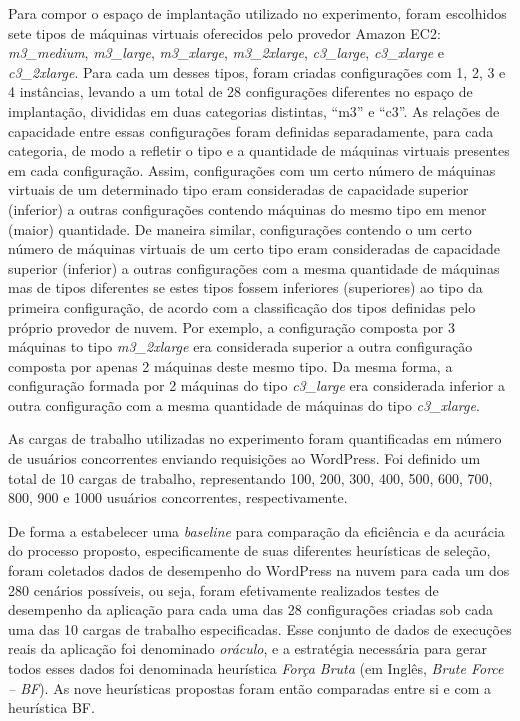 \documentclass[10pt,conference,compsocconf]{IEEEtran}
\begin{document}
Para compor o espaço de implantação utilizado no experimento, 
foram escolhidos sete tipos de máquinas virtuais oferecidos pelo provedor Amazon EC2:
{\em m3\_medium}, {\em m3\_large}, {\em m3\_xlarge}, {\em m3\_2xlarge}, {\em c3\_large}, {\em c3\_xlarge} e {\em c3\_2xlarge}. Para cada um desses tipos, foram criadas configurações
com 1, 2, 3 e 4 instâncias, levando a um total de 28 configurações diferentes no espaço de implantação, divididas em duas categorias distintas, ``m3'' e ``c3''. As relações de capacidade entre essas configurações foram definidas separadamente, para cada categoria, de modo a refletir o tipo e a quantidade de máquinas virtuais presentes em cada configuração. Assim, configurações com um certo número de máquinas virtuais de um determinado tipo eram consideradas de capacidade superior (inferior) a outras configurações contendo máquinas do mesmo tipo em menor (maior) quantidade. De maneira similar, configurações contendo o um certo número de máquinas virtuais de um certo tipo eram consideradas de capacidade superior (inferior) a outras configurações com a mesma quantidade de máquinas mas de tipos diferentes se estes tipos fossem inferiores (superiores) ao tipo da primeira configuração, de acordo com a classificação dos tipos definidas pelo próprio provedor de nuvem.  Por exemplo, a configuração composta por 3 máquinas to tipo {\em m3\_2xlarge} era considerada superior a outra configuração composta por apenas 2 máquinas deste mesmo tipo. Da mesma forma, a configuração formada por 2 máquinas do tipo  {\em c3\_large} era considerada inferior a outra configuração com a mesma quantidade de máquinas do tipo {\em c3\_xlarge}.

As cargas de trabalho utilizadas no experimento foram quantificadas em número de usuários concorrentes enviando requisições ao WordPress. Foi definido um total de 10 cargas de trabalho, representando 100, 200, 300, 400, 500, 600, 700, 800, 900 e 1000 usuários concorrentes, respectivamente. 

De forma a estabelecer uma \emph{baseline} para comparação da eficiência e da acurácia do processo proposto, especificamente de suas diferentes heurísticas de seleção, foram coletados dados de desempenho do WordPress na nuvem para cada um dos 280 cenários possíveis, ou seja, foram efetivamente realizados testes de desempenho da aplicação para cada uma das 28 configurações criadas sob cada uma das 10 cargas de trabalho especificadas. Esse conjunto
de dados de execuções reais da aplicação foi denominado {\em oráculo}, e a estratégia necessária para gerar todos esses dados foi denominada heurística {\em Força Bruta} (em Inglês, {\em Brute Force -- BF}). As nove heurísticas propostas foram então comparadas entre si e com a heurística BF.
\end{document}
